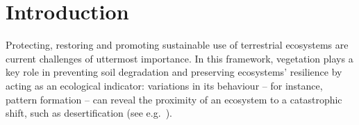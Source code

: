 \documentclass[11pt]{elsarticle}
\theoremstyle{plain}
\theoremstyle{definition}
\theoremstyle{myremark}
\begin{document}
\section{Introduction}




Protecting, restoring and promoting sustainable use of terrestrial ecosystems are current challenges of uttermost importance. 
In this framework, vegetation plays a key role in preventing soil degradation and preserving ecosystems' resilience by acting as an ecological indicator: variations in its behaviour -- for instance, pattern formation -- can reveal the proximity of an ecosystem to a catastrophic shift, such as desertification (see e.g.~\cite{Kefi_2007, Kefi_2014}). 
\end{document}
